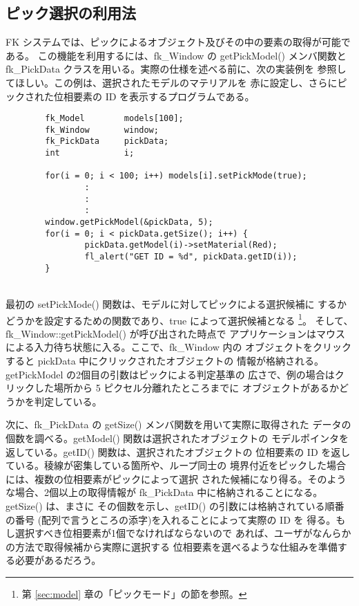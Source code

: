 \subsection{ピック選択の利用法} \label{sec:pickexam}
FK システムでは、ピックによるオブジェクト及びその中の要素の取得が可能である。
この機能を利用するには、fk\_Window の getPickModel() メンバ関数と
fk\_PickData クラスを用いる。実際の仕様を述べる前に、次の実装例を
参照してほしい。この例は、選択されたモデルのマテリアルを
赤に設定し、さらにピックされた位相要素の ID を表示するプログラムである。
\\
\begin{breakbox}
\begin{verbatim}
        fk_Model        models[100];
        fk_Window       window;
        fk_PickData     pickData;
        int             i;

        for(i = 0; i < 100; i++) models[i].setPickMode(true);
                :
                :
                :
        window.getPickModel(&pickData, 5);
        for(i = 0; i < pickData.getSize(); i++) {
                pickData.getModel(i)->setMaterial(Red);
                fl_alert("GET ID = %d", pickData.getID(i));
        }
\end{verbatim}
\end{breakbox}
~ \\
最初の setPickMode() 関数は、モデルに対してピックによる選択候補に
するかどうかを設定するための関数であり、true によって選択候補となる
\footnote{第 \ref{sec:model} 章の「ピックモード」の節を参照。}。
そして、fk\_Window::getPickModel() が呼び出された時点で
アプリケーションはマウスによる入力待ち状態に入る。ここで、fk\_Window 内の
オブジェクトをクリックすると pickData 中にクリックされたオブジェクトの
情報が格納される。getPickModel の2個目の引数はピックによる判定基準の
広さで、例の場合はクリックした場所から 5 ピクセル分離れたところまでに
オブジェクトがあるかどうかを判定している。

次に、fk\_PickData の getSize() メンバ関数を用いて実際に取得された
データの個数を調べる。getModel() 関数は選択されたオブジェクトの
モデルポインタを返している。getID() 関数は、選択されたオブジェクトの
位相要素の ID を返している。稜線が密集している箇所や、ループ同士の
境界付近をピックした場合には、複数の位相要素がピックによって選択
された候補になり得る。そのような場合、2個以上の取得情報が
fk\_PickData 中に格納されることになる。getSize() は、まさに
その個数を示し、getID() の引数には格納されている順番の番号
(配列で言うところの添字)を入れることによって実際の ID を
得る。もし選択すべき位相要素が1個でなければならないので
あれば、ユーザがなんらかの方法で取得候補から実際に選択する
位相要素を選べるような仕組みを準備する必要があるだろう。

